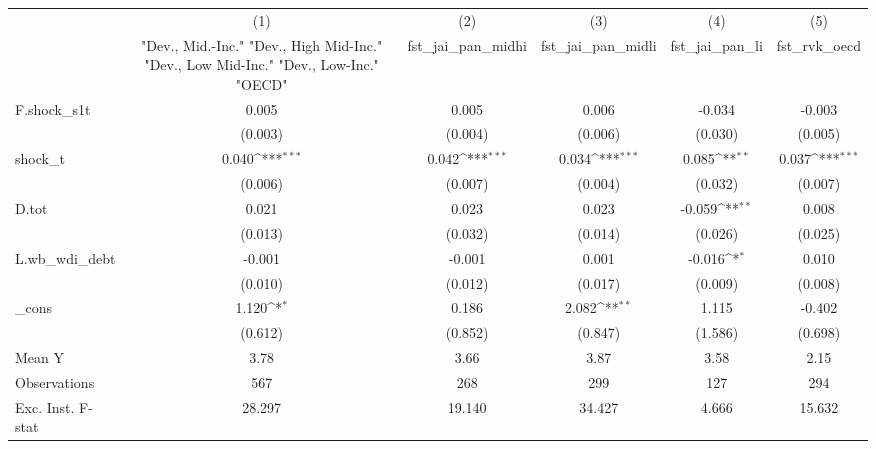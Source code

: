 {
\def\sym#1{\ifmmode^{#1}\else\(^{#1}\)\fi}
\begin{tabular}{l*{5}{c}}
\toprule
            &\multicolumn{1}{c}{(1)}&\multicolumn{1}{c}{(2)}&\multicolumn{1}{c}{(3)}&\multicolumn{1}{c}{(4)}&\multicolumn{1}{c}{(5)}\\
            &\multicolumn{1}{c}{ "Dev., Mid.-Inc." "Dev., High Mid-Inc." "Dev., Low Mid-Inc." "Dev., Low-Inc." "OECD" }&\multicolumn{1}{c}{fst\_jai\_pan\_midhi}&\multicolumn{1}{c}{fst\_jai\_pan\_midli}&\multicolumn{1}{c}{fst\_jai\_pan\_li}&\multicolumn{1}{c}{fst\_rvk\_oecd}\\
\midrule
F.shock\_s1t &       0.005         &       0.005         &       0.006         &      -0.034         &      -0.003         \\
            &     (0.003)         &     (0.004)         &     (0.006)         &     (0.030)         &     (0.005)         \\
\addlinespace
shock\_t     &       0.040\sym{***}&       0.042\sym{***}&       0.034\sym{***}&       0.085\sym{**} &       0.037\sym{***}\\
            &     (0.006)         &     (0.007)         &     (0.004)         &     (0.032)         &     (0.007)         \\
\addlinespace
D.tot       &       0.021         &       0.023         &       0.023         &      -0.059\sym{**} &       0.008         \\
            &     (0.013)         &     (0.032)         &     (0.014)         &     (0.026)         &     (0.025)         \\
\addlinespace
L.wb\_wdi\_debt&      -0.001         &      -0.001         &       0.001         &      -0.016\sym{*}  &       0.010         \\
            &     (0.010)         &     (0.012)         &     (0.017)         &     (0.009)         &     (0.008)         \\
\addlinespace
\_cons      &       1.120\sym{*}  &       0.186         &       2.082\sym{**} &       1.115         &      -0.402         \\
            &     (0.612)         &     (0.852)         &     (0.847)         &     (1.586)         &     (0.698)         \\
\midrule
Mean Y      &        3.78         &        3.66         &        3.87         &        3.58         &        2.15         \\
Observations&         567         &         268         &         299         &         127         &         294         \\
Exc. Inst. F-stat&      28.297         &      19.140         &      34.427         &       4.666         &      15.632         \\
\bottomrule
\end{tabular}
}

